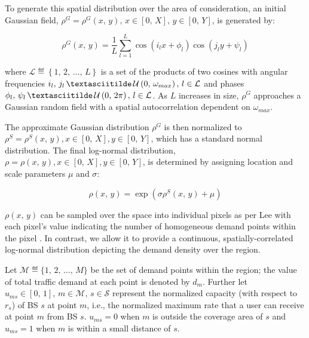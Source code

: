 \documentclass[onecolumn,draftcls]{IEEEtran}
\begin{document}
To generate this spatial distribution over the area of consideration, an initial Gaussian field, $\rho^G = \rho^G\left(x,\, y\right),\, x \in \left[0,\, X\right],\, y \in \left[0,\, Y\right]$, is generated by:

\begin{equation}
\rho^G\left(x,\, y\right)=\frac{1}{L}\sum_{l=1}^L \cos\left(i_lx+\phi_l\right) \cos\left(j_ly+\psi_l\right)
\end{equation}

\noindent \sloppy where $\mathcal{L} \eqdef \left\{1,\, 2,\, \ldots,\, L\right\}$ is a set of the products of two cosines with angular frequencies $i_l,\, j_l\, \textasciitilde\, \mathcal{U}\left(0,\, \omega_{max}\right),\, l \in \mathcal{L}$ and phases $\phi_l,\, \psi_l\, \textasciitilde\, \mathcal{U}\left(0,\, 2\pi\right),\, l \in \mathcal{L}$.  As $L$ increases in size, $\rho^G$ approaches a Gaussian random field with a spatial autocorrelation dependent on $\omega_{max}$.

The approximate Gaussian distribution $\rho^G$ is then normalized to $\rho^S = \rho^S(x,\, y), x \in [0,\, X], y \in [0,\, Y]$, which has a standard normal distribution.  The final log-normal distribution, $\rho = \rho(x,\, y), x \in [0,\, X], y \in [0,\, Y]$, is determined by assigning location and scale parameters $\mu$ and $\sigma$:

\begin{equation}
\rho\left(x,\, y\right) = \exp\left(\sigma\rho^S\left(x,\, y\right)+\mu\right)
\end{equation}

$\rho\left(x,\, y\right)$ can be sampled over the space into individual pixels as per Lee with each pixel's value indicating the number of homogeneous demand points within the pixel \cite{6554749}.  In contrast, we allow it to provide a continuous, spatially-correlated log-normal distribution depicting the demand density over the region.

Let $ \mathcal{M} \eqdef \{1,\, 2,\, \ldots,\, M\} $ be the set of demand points within the region; the value of total traffic demand at each point is denoted by $d_m$.  Further let $ u_{ms} \in [0,\, 1],\, m \in \mathcal{M},\, s \in \mathcal{S} $ represent the normalized capacity (with respect to $r_s$) of BS $s$ at point $m$, i.e., the normalized maximum rate that a user can receive at point $m$ from BS $s$.  $u_{ms} = 0$ when $m$ is outside the coverage area of $s$ and $u_{ms} = 1$ when $m$ is within a small distance of $s$.%
\end{document}

